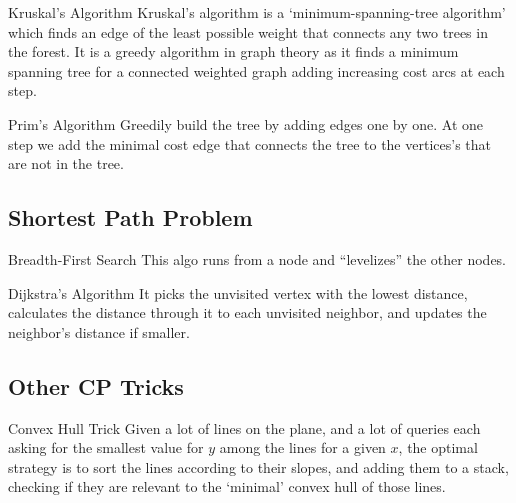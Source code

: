 


{Kruskal's Algorithm}{
    Kruskal's algorithm is a `minimum-spanning-tree algorithm' which
    finds an edge of the least possible weight that connects any two trees in the
    forest. It is a greedy algorithm in graph theory as it finds a minimum
    spanning tree for a connected weighted graph adding increasing cost arcs at
    each step.
}



{Prim's Algorithm}{
    Greedily build the tree by adding edges one by one. At one step we
    add the minimal cost edge that connects the tree to the vertices's that are
    not in the tree.
}


\subsection{Shortest Path Problem}



{Breadth-First Search}{
    This algo runs from a node and ``levelizes'' the other nodes.
}


{Dijkstra's Algorithm}{
    It picks the unvisited vertex with the lowest distance, calculates
    the distance through it to each unvisited neighbor, and updates the neighbor's
    distance if smaller.
}


\subsection{Other CP Tricks}

\label{theorem:swap_sort_steps_parity}



{Convex Hull Trick}{
    Given
    a lot of lines on the plane, and a lot of queries each asking for the smallest
    value for $ y $ among the lines for a given $ x $, the optimal strategy is to
    sort the lines according to their slopes, and adding them to a stack, checking
    if they are relevant to the `minimal' convex hull of those lines.
}

